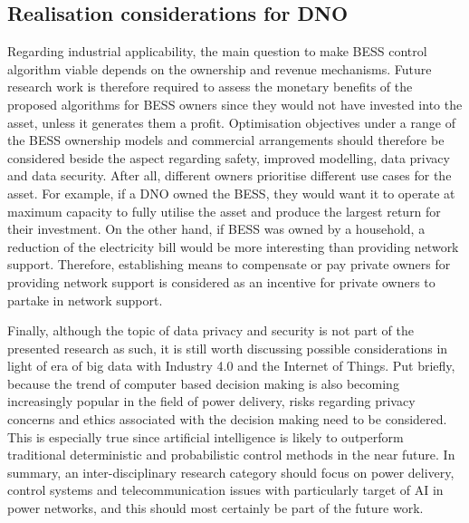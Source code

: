 \subsection{Realisation considerations for DNO}

Regarding industrial applicability, the main question to make BESS control algorithm viable depends on the ownership and revenue mechanisms.
Future research work is therefore required to assess the monetary benefits of the proposed algorithms for BESS owners since they would not have invested into the asset, unless it generates them a profit.
Optimisation objectives under a range of the BESS ownership models and commercial arrangements should therefore be considered beside the aspect regarding safety, improved modelling, data privacy and data security.
After all, different owners prioritise different use cases for the asset.
For example, if a DNO owned the BESS, they would want it to operate at maximum capacity to fully utilise the asset and produce the largest return for their investment.
On the other hand, if BESS was owned by a household, a reduction of the electricity bill would be more interesting than providing network support.
Therefore, establishing means to compensate or pay private owners for providing network support is considered as an incentive for private owners to partake in network support.

Finally, although the topic of data privacy and security is not part of the presented research as such, it is still worth discussing possible considerations in light of era of big data with Industry 4.0 and the Internet of Things.
Put briefly, because the trend of computer based decision making is also becoming increasingly popular in the field of power delivery, risks regarding privacy concerns and ethics associated with the decision making need to be considered.
This is especially true since artificial intelligence is likely to outperform traditional deterministic and probabilistic control methods in the near future.
In summary, an inter-disciplinary research category should focus on power delivery, control systems and telecommunication issues with particularly target of AI in power networks, and this should most certainly be part of the future work.

